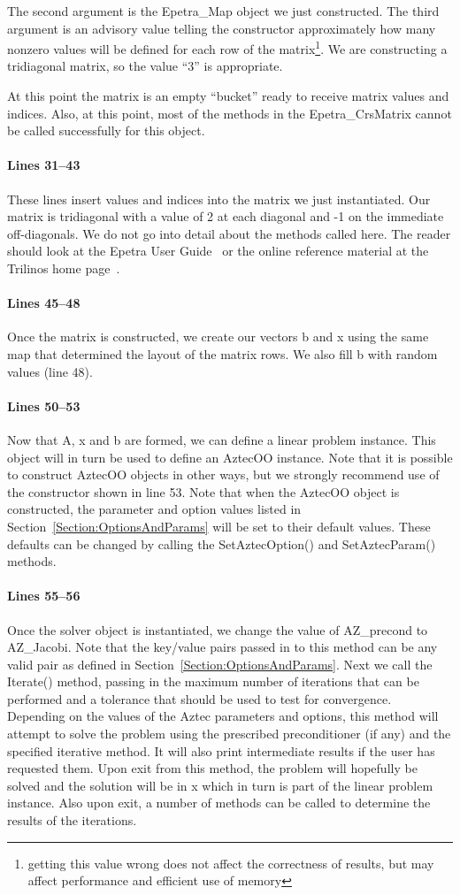 \documentclass[12pt,relax]{AztecOOUserGuide}
\newcommand{\map}{Epetra\_Map}
\newcommand{\crsmatrix}{Epetra\_CrsMatrix}
\begin{document}
The second argument is the \map{} object we just constructed.  The
third argument is an advisory value telling the constructor
approximately how many nonzero values will be defined for each row of
the matrix\footnote{getting this value wrong does not
affect the correctness of results, but may affect performance and
efficient use of memory}.  We are constructing a tridiagonal matrix, 
so the value ``3'' is appropriate.

At this point the matrix is an empty ``bucket'' ready to receive
matrix values and indices.  Also, at this point, most of the methods
in the \crsmatrix{} cannot be called successfully for this object.
\paragraph{Lines 31--43}
These lines insert values and indices into the matrix we just
instantiated.  Our matrix is tridiagonal with a value of 2 at each
diagonal and -1 on the immediate off-diagonals.  We do not go into
detail about the methods called here.  The reader should look at the
Epetra User Guide~\cite{Epetra-User-Guide} or the online reference
material at the Trilinos home page~\cite{Trilinos-home-page}.
\paragraph{Lines 45--48}
Once the matrix is constructed, we create our vectors b and x using
the same map that determined the layout of the matrix rows.  We also
fill b with random values (line 48).
\paragraph{Lines 50--53}
Now that A, x and b are formed, we can define a linear problem
instance.  This object will in turn be used to define an AztecOO
instance.  Note that it is possible to construct AztecOO objects in
other ways, but we strongly recommend use of the constructor shown in
line 53.  Note that when the AztecOO object is constructed, the
parameter and option values listed in
Section~\ref{Section:OptionsAndParams} will be set to their default
values.  These defaults can be changed by calling the SetAztecOption()
and SetAztecParam() methods.
\paragraph{Lines 55--56}
Once the solver object is instantiated, we change the value of
AZ\_precond to AZ\_Jacobi.  Note that the key/value pairs passed in to
this method can be any valid pair as defined in
Section~\ref{Section:OptionsAndParams}.  Next we call the Iterate()
method, passing in the maximum number of iterations that can be
performed and a tolerance that should be used to test for
convergence.  Depending on the values of the Aztec parameters and
options, this method will attempt to solve the problem using the
prescribed preconditioner (if any) and the specified iterative
method.  It will also print intermediate results if the user has
requested them.  Upon exit from this method, the problem will
hopefully be solved and the solution will be in x which in turn is
part of the linear problem instance.  Also upon exit, a number of
methods can be called to determine the results of the iterations.
\end{document}
